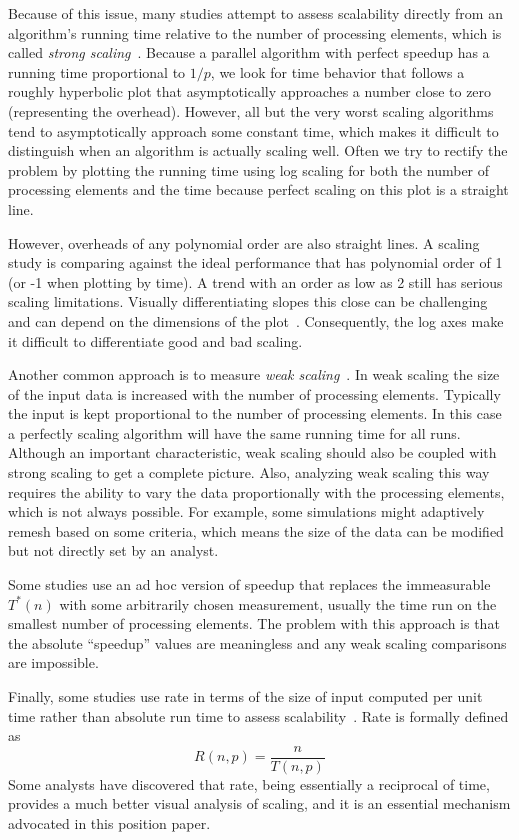 \documentclass[conference]{IEEEtran}
\newcommand*{\lcite}[1]{~\cite{#1}}
\newcommand*{\keyterm}[1]{\emph{#1}}
\begin{document}
Because of this issue, many studies attempt to assess scalability directly
from an algorithm's running time relative to the number of processing
elements, which is called \keyterm{strong scaling}\lcite{Kaminsky2014}.
Because a parallel algorithm with perfect speedup has a running time
proportional to $1/p$, we look for time behavior that follows a roughly
hyperbolic plot that asymptotically approaches a number close to zero
(representing the overhead). However, all but the very worst scaling
algorithms tend to asymptotically approach some constant time, which makes
it difficult to distinguish when an algorithm is actually scaling
well. Often we try to rectify the problem by plotting the running time
using log scaling for both the number of processing elements and the time
because perfect scaling on this plot is a straight line.

However, overheads of any polynomial order are also straight lines. A
scaling study is comparing against the ideal performance that has
polynomial order of 1 (or -1 when plotting by time). A trend with an order
as low as 2 still has serious scaling limitations. Visually differentiating
slopes this close can be challenging and can depend on the dimensions of
the plot\lcite{Cleveland1994}. Consequently, the log axes make it difficult
to differentiate good and bad scaling.

Another common approach is to measure \keyterm{weak scaling}\lcite{Kaminsky2014}.
In weak scaling the size of the input data is increased with the number of
processing elements. Typically the input is kept proportional to the number
of processing elements. In this case a perfectly scaling algorithm will
have the same running time for all runs. Although an important
characteristic, weak scaling should also be coupled with strong scaling to
get a complete picture. Also, analyzing weak scaling this way requires the
ability to vary the data proportionally with the processing elements, which
is not always possible.  For example, some simulations might adaptively
remesh based on some criteria, which means the size of the data can be
modified but not directly set by an analyst.

Some studies use an ad hoc version of speedup that replaces the
immeasurable $T^*(n)$ with some arbitrarily chosen measurement, usually the
time run on the smallest number of processing elements. The problem with
this approach is that the absolute ``speedup'' values are meaningless and
any weak scaling comparisons are impossible.

Finally, some studies use rate in terms of the size of input computed per
unit time rather than absolute run time to assess
scalability\lcite{Kaminsky2014}. Rate is formally defined as
\begin{equation}
  R(n,p) = \frac{n}{T(n,p)}
  \label{eq:Rate}
\end{equation}
Some analysts have discovered that rate, being essentially a reciprocal of
time, provides a much better visual analysis of scaling, and it is
an essential mechanism advocated in this position paper.
\end{document}
